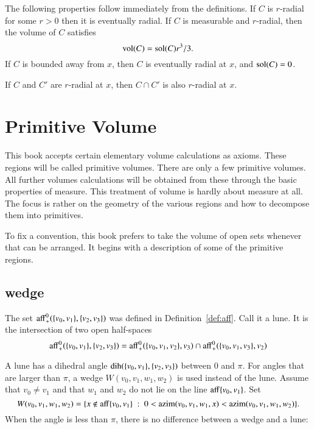 The following properties follow immediately from the definitions.
If $C$ is $r$-radial for some $r>0$ then it is eventually radial.
If $C$ is measurable and $r$-radial, then the volume of $C$
satisfies
    $$
    {\operatorname{vol}}(C) = {\operatorname{sol}}(C) r^3/3.
    $$
If $C$ is bounded away from $x$, then $C$ is eventually radial at
$x$, and ${\operatorname{sol}}(C) = 0$.

\begin{lemma}  If $C$ and $C'$ are  $r$-radial
at $x$, then $C\cap C'$ is also $r$-radial at
$x$.
\end{lemma}






\section{Primitive Volume}

This book accepts
certain elementary volume calculations as axioms.  
These regions will be called primitive volumes.  There are only
a few primitive volumes.
All further
volumes calculations will be obtained from these through the basic
properties of measure.   
This treatment of volume is hardly about measure at all.  The focus is rather on the geometry of the various regions and how to decompose them into primitives.

To fix a convention, this book prefers to take the volume of open sets whenever that can be arranged.  It begins with a description of some of the primitive regions.

\subsection{wedge}


The set ${\operatorname{aff}}^0_+(\{v_0,v_1\},\{v_2,v_3\})$ was defined
in Definition~\ref{def:aff}.  Call it a lune.  It is the intersection
of two open half-spaces
    $$
    {\operatorname{aff}}^0_+(\{v_0,v_1\},\{v_2,v_3\})
    ={\operatorname{aff}}^0_+(\{v_0,v_1,v_2\},v_3)\cap
    {\operatorname{aff}}^0_+(\{v_0,v_1,v_3\},v_2)
    $$


A lune has a dihedral angle $\operatorname{dih}(\{v_0,v_1\},\{v_2,v_3\})$ between
$0$ and $\pi$.   For angles that are larger than $\pi$,   a wedge
$W(v_0,v_1,w_1,w_2)$ is used instead of the lune.  Assume that $v_0\ne v_1$ and that
$w_1$ and $w_2$ do not lie on
the line ${\operatorname{aff}}\{v_0,v_1\}$.  Set
$$
W(v_0,v_1,w_1,w_2) = 
  \{x\not\in{\operatorname{aff}}\{v_0,v_1\} \ :\  
  0< {\operatorname{azim}}(v_0,v_1,w_1,x) < {\operatorname{azim}}(v_0,v_1,w_1,w_2)\}.
$$
When the angle is less than $\pi$, there is no difference between
a wedge and a lune:

